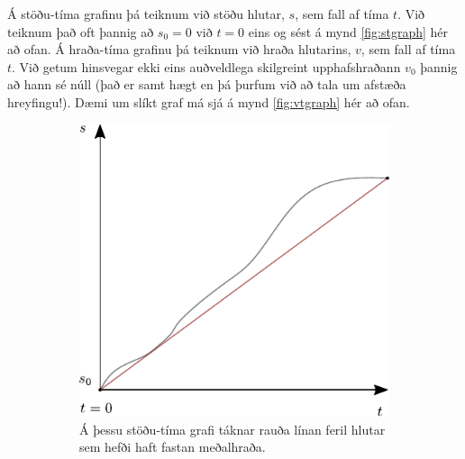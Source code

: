 \ifdefined \wholebook \else\documentclass[oneside]{book}\usepackage{EdlBook}\graphicspath{{figures/}}
\begin{document}
Á stöðu-tíma grafinu þá teiknum við stöðu hlutar, $s$, sem fall af tíma $t$. Við teiknum það oft þannig að $s_0 = 0$ við $t = 0$ eins og sést á mynd \ref{fig:stgraph} hér að ofan. Á hraða-tíma grafinu þá teiknum við hraða hlutarins, $v$, sem fall af tíma $t$. Við getum hinsvegar ekki eins auðveldlega skilgreint upphafshraðann $v_0$ þannig að hann sé núll (það er samt hægt en þá þurfum við að tala um afstæða hreyfingu!). Dæmi um slíkt graf má sjá á mynd \ref{fig:vtgraph} hér að ofan. \\


\begin{figure}[H]
    \centering
\begin{subfigure}[h]{.4\textwidth}
    \centering
    \includegraphics[width=\linewidth]{figures/stodutimagraf-medalhradi.pdf}
    \caption{Á þessu stöðu-tíma grafi táknar rauða línan feril hlutar sem hefði haft fastan meðalhraða.}
    \label{fig:st-medalhradi}
\end{subfigure}
\hfill
\begin{subfigure}[h]{.4\textwidth}
    \centering

\end{subfigure}
\end{figure}
\end{document}
